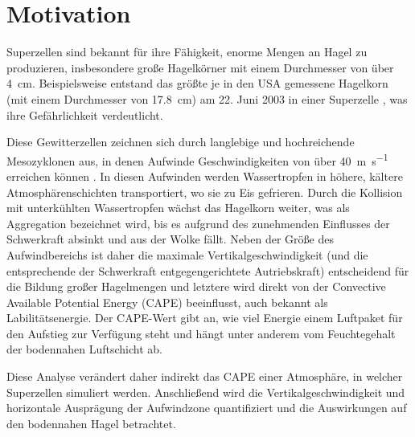 \section{Motivation}


Superzellen sind bekannt für ihre Fähigkeit, enorme Mengen an Hagel zu produzieren, insbesondere große Hagelkörner mit einem Durchmesser von über \SI{4}{\cm}. Beispielsweise entstand das größte je in den USA gemessene Hagelkorn (mit einem Durchmesser von \SI{17.8}{\cm}) am 22. Juni 2003 in einer Superzelle \parencite{spektrum2003}, was ihre Gefährlichkeit verdeutlicht.

Diese Gewitterzellen zeichnen sich durch langlebige und hochreichende Mesozyklonen aus, in denen Aufwinde Geschwindigkeiten von über \SI{40}{\m\per\s} erreichen können \parencite{krider}. In diesen Aufwinden werden Wassertropfen in höhere, kältere Atmosphärenschichten transportiert, wo sie zu Eis gefrieren. Durch die Kollision mit unterkühlten Wassertropfen wächst das Hagelkorn weiter, was als Aggregation bezeichnet wird, bis es aufgrund des zunehmenden Einflusses der Schwerkraft absinkt und aus der Wolke fällt. Neben der Größe des Aufwindbereichs ist daher die maximale Vertikalgeschwindigkeit (und die entsprechende der Schwerkraft entgegengerichtete Autriebskraft) entscheidend für die Bildung großer Hagelmengen und letztere wird direkt von der Convective Available Potential Energy (CAPE) beeinflusst, auch bekannt als Labilitätsenergie. Der CAPE-Wert gibt an, wie viel Energie einem Luftpaket für den Aufstieg zur Verfügung steht und hängt unter anderem vom Feuchtegehalt der bodennahen Luftschicht ab.

Diese Analyse verändert daher indirekt das CAPE einer Atmosphäre, in welcher Superzellen simuliert werden. Anschließend wird die Vertikalgeschwindigkeit und horizontale Ausprägung der Aufwindzone quantifiziert und die Auswirkungen auf den bodennahen Hagel betrachtet.

